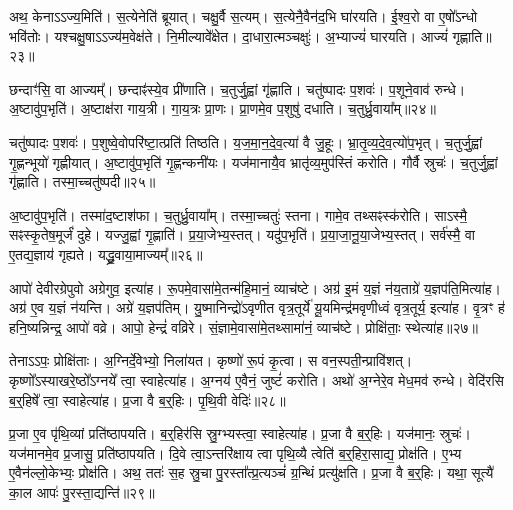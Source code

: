 अथ॒ केनाऽऽज्य॒मिति॑।
स॒त्येनेति॑ ब्रूयात्।
चक्षु॒र्वै स॒त्यम्।
स॒त्येनै॒वैन॑द॒भि घा॑रयति।
ई॒श्व॒रो वा ए॒षो᳚\-ऽन्धो भवि॑तोः।
यश्चक्षु॒षा\-ऽऽज्य॑म॒वेक्ष॑ते।
नि॒मील्यावे᳚क्षेत।
दा॒धारा॒त्मञ्चक्षुः॑।
अ॒भ्याज्यं॑ घारयति।
आज्यं॑ गृह्णाति॥२३॥\ip

छन्दाꣳ॑सि॒ वा आज्यम्᳚।
छन्दाꣴ॑स्ये॒व प्री॑णाति।
च॒तुर्जु॒ह्वां गृ॑ह्णाति।
चतु॑ष्पादः प॒शवः॑।
प॒शूने॒वाव॑ रुन्धे।
अ॒ष्टावु॑प॒भृति॑।
अ॒ष्टाक्ष॑रा गाय॒त्री।
गा॒य॒त्रः प्रा॒णः।
प्रा॒णमे॒व प॒शुषु॑ दधाति।
च॒तुर्ध्रु॒वाया᳚म्॥२४॥\ip

चतु॑ष्पादः प॒शवः॑।
प॒शुष्वे॒वोपरि॑ष्टा॒त्प्रति॑ तिष्ठति।
य॒ज॒मा॒न॒दे॒व॒त्या॑ वै जु॒हूः।
भ्रा॒तृ॒व्य॒दे॒व॒त्यो॑प॒भृत्।
च॒तुर्जु॒ह्वां गृ॒ह्णन्भूयो॑ गृह्णीयात्।
अ॒ष्टावु॑प॒भृति॑ गृ॒ह्णन्कनी॑यः।
यज॑मानायै॒व भ्रातृ॑व्य॒मुप॑स्तिं करोति।
गौर्वै स्रुचः॑।
च॒तुर्जु॒ह्वां गृ॑ह्णाति।
तस्मा॒च्चतु॑ष्पदी॥२५॥\ip

अ॒ष्टावु॑प॒भृति॑।
तस्मा॑द॒ष्टाश॑फा।
च॒तुर्ध्रु॒वाया᳚म्।
तस्मा॒च्चतुः॑ स्तना।
गामे॒व तथ्सꣴस्क॑रोति।
साऽस्मै॒ सꣴस्कृ॒तेष॒मूर्जं॑ दुहे।
यज्जु॒ह्वां गृ॒ह्णाति॑।
प्र॒या॒जेभ्य॒स्तत्।
यदु॑प॒भृति॑।
प्र॒या॒जा॒नू॒या॒जेभ्य॒स्तत्।
सर्व॑स्मै॒ वा ए॒तद्य॒ज्ञाय॑ गृह्यते।
यद्ध्रु॒वाया॒माज्यम्᳚॥२६॥\ip\anuvakamend[अ॒भि॒घा॒रय॑ति गृह्णाति ध्रु॒वायां॒ चतु॑ष्पदी प्रयाजानूया॒जेभ्य॒स्तद्द्वे च॑]

आपो॑ देवीरग्रेपुवो अग्रेगुव॒ इत्या॑ह।
रू॒पमे॒वासा॑मे॒तन्म॑हि॒\-मानं॒ व्याच॑ष्टे।
अग्र॑ इ॒मं य॒ज्ञं न॑य॒ताग्रे॑ य॒ज्ञप॑ति॒मित्या॑ह।
अग्र॑ ए॒व य॒ज्ञं न॑यन्ति।
अग्रे॑ य॒ज्ञप॑तिम्।
यु॒ष्मानिन्द्रो॑\-ऽवृणीत वृत्र॒तूर्ये॑ यू॒यमिन्द्र॑मवृणीध्वं वृत्र॒तूर्य॒ इत्या॑ह।
वृ॒त्रꣳ ह॑ हनि॒ष्यन्निन्द्र॒ आपो॑ वव्रे।
आपो॒ हेन्द्रं॑ वव्रिरे।
सं॒ज्ञामे॒वासा॑मे॒तथ्सामा॑नं॒ व्याच॑ष्टे।
प्रोक्षि॑ताः॒ स्थेत्या॑ह॥२७॥\ip

तेनाऽऽपः॒ प्रोक्षि॑ताः।
अ॒ग्निर्दे॒वेभ्यो॒ निला॑यत।
कृष्णो॑ रू॒पं कृ॒त्वा।
स वन॒स्पती॒न्प्रावि॑शत्।
कृष्णो᳚\-ऽस्याखरे॒ष्ठो᳚\-ऽग्नये᳚ त्वा॒ स्वाहे\-त्या॑ह।
अ॒ग्नय॑ ए॒वैनं॒ जुष्टं॑ करोति।
अथो॑ अ॒ग्नेरे॒व मेध॒मव॑ रुन्धे।
वेदि॑\-रसि ब॒र्॒हिषे᳚ त्वा॒ स्वाहेत्या॑ह।
प्र॒जा वै ब॒र्॒हिः।
पृ॒थि॒वी वेदिः॑॥२८॥\ip

प्र॒जा ए॒व पृ॑थि॒व्यां प्रति॑\-ष्ठापयति।
ब॒र्॒हिर॑सि स्रु॒ग्भ्यस्त्वा॒ स्वाहेत्या॑ह।
प्र॒जा वै ब॒र्॒हिः।
यज॑मानः॒ स्रुचः॑।
यज॑मानमे॒व प्र॒जासु॒ प्रति॑\-ष्ठापयति।
दि॒वे त्वा॒\-ऽन्तरि॑क्षाय त्वा पृथि॒व्यै त्वेति॑ ब॒र्॒हिरा॒साद्य॒ प्रोक्ष॑ति।
ए॒भ्य ए॒वैन॑ल्लो॒केभ्यः॒ प्रोक्ष॑ति।
अथ॒ ततः॑ स॒ह स्रु॒चा पु॒रस्ता᳚त्प्र॒त्यञ्चं॑ ग्र॒न्थिं प्रत्यु॑क्षति।
प्र॒जा वै ब॒र्॒हिः।
यथा॒ सूत्यै॑ का॒ल आपः॑ पु॒रस्ता॒द्यन्ति॑॥२९॥\ip

